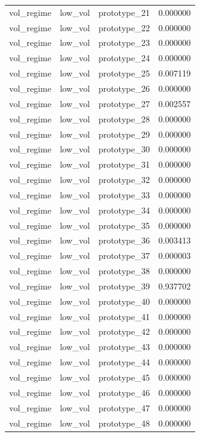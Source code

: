 \begin{tabular}{lllr}
vol\_regime & low\_vol & prototype\_21 & 0.000000 \\
vol\_regime & low\_vol & prototype\_22 & 0.000000 \\
vol\_regime & low\_vol & prototype\_23 & 0.000000 \\
vol\_regime & low\_vol & prototype\_24 & 0.000000 \\
vol\_regime & low\_vol & prototype\_25 & 0.007119 \\
vol\_regime & low\_vol & prototype\_26 & 0.000000 \\
vol\_regime & low\_vol & prototype\_27 & 0.002557 \\
vol\_regime & low\_vol & prototype\_28 & 0.000000 \\
vol\_regime & low\_vol & prototype\_29 & 0.000000 \\
vol\_regime & low\_vol & prototype\_30 & 0.000000 \\
vol\_regime & low\_vol & prototype\_31 & 0.000000 \\
vol\_regime & low\_vol & prototype\_32 & 0.000000 \\
vol\_regime & low\_vol & prototype\_33 & 0.000000 \\
vol\_regime & low\_vol & prototype\_34 & 0.000000 \\
vol\_regime & low\_vol & prototype\_35 & 0.000000 \\
vol\_regime & low\_vol & prototype\_36 & 0.003413 \\
vol\_regime & low\_vol & prototype\_37 & 0.000003 \\
vol\_regime & low\_vol & prototype\_38 & 0.000000 \\
vol\_regime & low\_vol & prototype\_39 & 0.937702 \\
vol\_regime & low\_vol & prototype\_40 & 0.000000 \\
vol\_regime & low\_vol & prototype\_41 & 0.000000 \\
vol\_regime & low\_vol & prototype\_42 & 0.000000 \\
vol\_regime & low\_vol & prototype\_43 & 0.000000 \\
vol\_regime & low\_vol & prototype\_44 & 0.000000 \\
vol\_regime & low\_vol & prototype\_45 & 0.000000 \\
vol\_regime & low\_vol & prototype\_46 & 0.000000 \\
vol\_regime & low\_vol & prototype\_47 & 0.000000 \\
vol\_regime & low\_vol & prototype\_48 & 0.000000 \\

\end{tabular}
